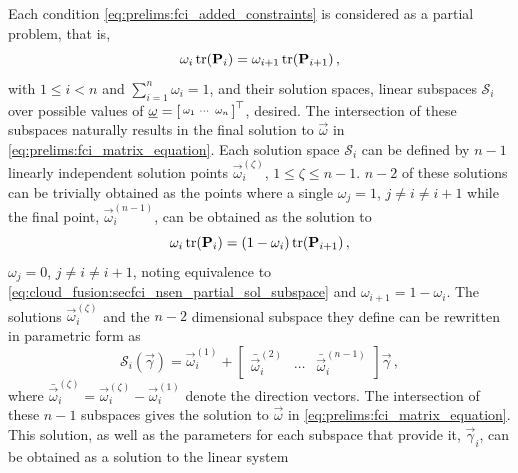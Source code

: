 Each condition \eqref{eq:prelims:fci_added_constraints} is considered as a partial problem, that is,
\begin{equation}\label{eq:cloud_fusion:secfci_nsen_partial_sol_subspace}
    \omega_i\tr(\mat{P}_i) = \omega_{i+1}\tr(\mat{P}_{i+1})\,,
\end{equation}
with $1\leq i< n$ and $\sum_{i=1}^n\omega_i=1$, and their solution spaces, linear subspaces $\mathcal{S}_i$ over possible values of $\vec{\omega}=\begin{bsmallmatrix}\omega_1 & \cdots & \omega_n\end{bsmallmatrix}^\top$, desired. The intersection of these subspaces naturally results in the final solution to $\vec{\omega}$ in \eqref{eq:prelims:fci_matrix_equation}. Each solution space $\mathcal{S}_i$ can be defined by $n-1$ linearly independent solution points $\vec{\omega}_i^{(\zeta)}$, $1\leq \zeta\leq n-1$. $n-2$ of these solutions can be trivially obtained as the points where a single $\omega_j=1$, $j\neq i\neq i+1$ while the final point, $\vec{\omega}_i^{(n-1)}$, can be obtained as the solution to
\begin{equation}\label{eq:cloud_fusion:secfci_nsen_partial_sol_point}
    \omega_i\tr(\mat{P}_i) = (1-\omega_i)\tr(\mat{P}_{i+1})\,,
\end{equation}
$\omega_j=0$, $j\neq i\neq i+1$, noting equivalence to \eqref{eq:cloud_fusion:secfci_nsen_partial_sol_subspace} and $\omega_{i+1}=1-\omega_i$. The solutions $\vec{\omega}_i^{(\zeta)}$ and the $n-2$ dimensional subspace they define can be rewritten in parametric form as
\begin{equation}\label{eq:cloud_fusion:secfci_nsen_partial_subspace}
    \mathcal{S}_i(\vec{\gamma})=\vec{\omega}_i^{(1)} + 
    \begin{bmatrix}
        \bar{\vec{\omega}}_i^{(2)} & \cdots & \bar{\vec{\omega}}_i^{(n-1)}
    \end{bmatrix}
    \vec{\gamma}\,,
\end{equation}
where $\bar{\vec{\omega}}_i^{(\zeta)}=\vec{\omega}_i^{(\zeta)}-\vec{\omega}_i^{(1)}$ denote the direction vectors. The intersection of these $n-1$ subspaces gives the solution to $\vec{\omega}$ in \eqref{eq:prelims:fci_matrix_equation}. This solution, as well as the parameters for each subspace that provide it, $\vec{\gamma}_i$, can be obtained as a solution to the linear system
